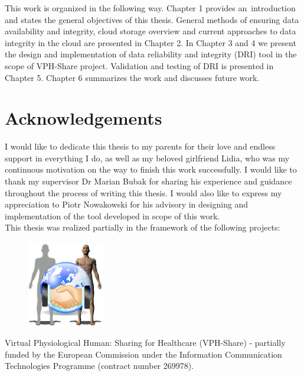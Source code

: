 \documentclass[pdflatex,en]{aghdpl}  %
\begin{document}
This work is organized in the following way. Chapter 1 provides an~introduction and states
the general objectives of this thesis. General methods of ensuring data availability and
integrity, cloud storage overview and current approaches to data integrity in the cloud are
presented in Chapter 2. In Chapter 3 and 4 we present the design and implementation of data
reliability and integrity (DRI) tool in the scope of VPH-Share project. Validation and testing
of DRI is presented in Chapter 5. Chapter 6 summarizes the work and discusses future work. 


\chapter*{Acknowledgements}
{}
I would like to dedicate this thesis to my parents for their love and endless
support in everything I do, as well as my beloved girlfriend Lidia, who was my continuous 
motivation on the way to finish this work successfully. I would like to thank my supervisor
Dr Marian Bubak for sharing his experience and guidance throughout the process of writing this
thesis. I would also like to express my appreciation to Piotr Nowakowski for his advisory in
designing and implementation of the tool developed in scope of this work.\\

This thesis was realized partially in the framework of the following projects:

\begin{figure}[h!]
	\centering
	\includegraphics[width=0.3\textwidth]{images/vph-logo.png}
\end{figure}

Virtual Physiological Human: Sharing for Healthcare (VPH-Share) - partially
funded by the European Commission under the Information Communication
Technologies Programme (contract number 269978).\\
\end{document}
